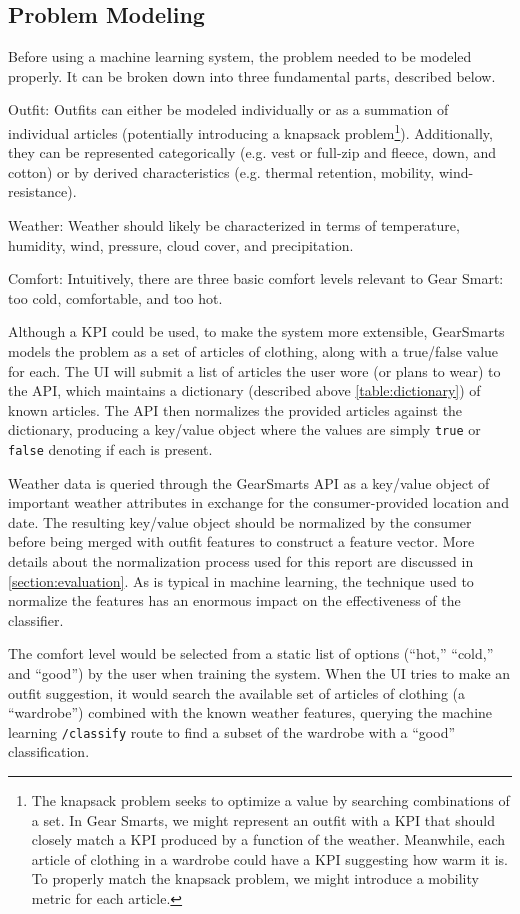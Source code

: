 \subsection{Problem Modeling}
Before using a machine learning system, the problem needed to be modeled properly. It can be broken down into three
fundamental parts, described below.

\begin{description}
  \item{Outfit:} Outfits can either be modeled individually or as a summation of individual articles (potentially introducing
  a knapsack problem\footnote{The knapsack problem seeks to optimize a value by searching combinations of a set. In Gear Smarts,
  we might represent an outfit with a KPI that should closely match a KPI produced by a function of the weather. Meanwhile, each
  article of clothing in a wardrobe could have a KPI suggesting how warm it is. To properly match the knapsack problem, we might
  introduce a mobility metric for each article.}).
  Additionally, they can be represented categorically (e.g. vest or full-zip and
  fleece, down, and cotton) or by derived characteristics (e.g. thermal retention, mobility, wind-resistance).
  \item{Weather:} Weather should likely be characterized in terms of temperature, humidity, wind, pressure,
  cloud cover, and precipitation.
  \item{Comfort:} Intuitively, there are three basic comfort levels relevant to Gear Smart: too cold, comfortable, and too hot.
\end{description}

Although a KPI could be used, to make the system more extensible, GearSmarts models the problem as a set of
articles of clothing, along with a true/false value for each. The UI will submit a list of articles the user wore (or
plans to wear) to the API, which maintains a dictionary (described above \ref{table:dictionary}) of known articles. The
API then normalizes the provided articles against the dictionary, producing a key/value object where the values are
simply \texttt{true} or \texttt{false} denoting if each is present.

Weather data is queried through the GearSmarts API as a key/value object of important
weather attributes in exchange for the consumer-provided location and date. The resulting key/value object should be
normalized by the consumer before being merged with outfit features to construct a feature vector. More details about
the normalization process used for this report are discussed in \ref{section:evaluation}. As is typical in
machine learning, the technique used to normalize the features has an enormous impact on the effectiveness of the
classifier.

The comfort level would be selected from a static list of options (``hot,'' ``cold,'' and ``good'') by the user when
training the system. When the UI tries to make an outfit suggestion, it would search the available set of articles of
clothing (a ``wardrobe'') combined with the known weather features, querying the machine learning \texttt{/classify}
route to find a subset of the wardrobe with a ``good'' classification.
